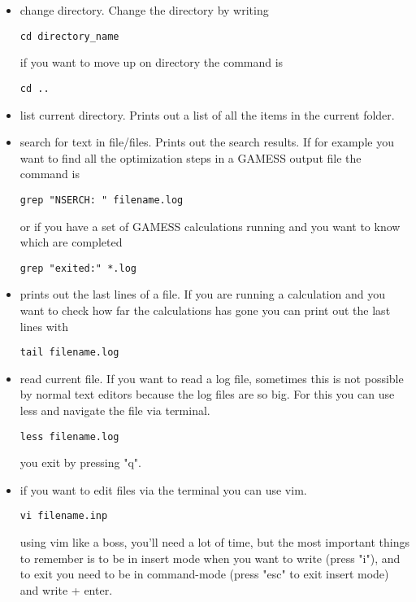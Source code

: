 \documentclass{article}
\begin{document}
\begin{itemize}

    \item {} change directory. Change the directory by writing
\begin{lstlisting}
cd directory_name
\end{lstlisting}

        if you want to move up on directory the command is
\begin{lstlisting}
cd ..
\end{lstlisting}

    \item {} list current directory. Prints out a list of all the items in the current folder.

    \item {} search for text in file/files. Prints out the search results. If for example you want to find all the optimization steps in a GAMESS output file the command is
\begin{lstlisting}
grep "NSERCH: " filename.log
\end{lstlisting}
        or if you have a set of GAMESS calculations running and you want to know which are completed
\begin{lstlisting}
grep "exited:" *.log
\end{lstlisting}

    \item {} prints out the last lines of a file. 
        If you are running a calculation and you want to check how far the calculations has gone you can print out the last lines with
\begin{lstlisting}
tail filename.log
\end{lstlisting}

    \item {} read current file. If you want to read a log file, sometimes this is not possible by normal text editors because the log files are so big. For this you can use less and navigate the file via terminal.
\begin{lstlisting}
less filename.log
\end{lstlisting}
    you exit by pressing "q".

    \item {} if you want to edit files via the terminal you can use vim. 
\begin{lstlisting}
vi filename.inp
\end{lstlisting}
using vim like a boss, you'll need a lot of time, but the most important things to remember is to be in insert mode when you want to write (press "i"), and to exit you need to be in command-mode (press "esc" to exit insert mode) and write  + enter.

\end{itemize}
\end{document}
